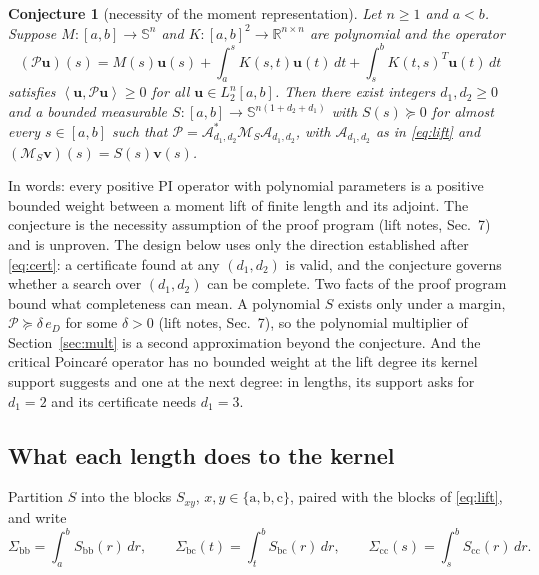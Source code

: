 \documentclass[12pt]{article}
\newcommand{\R}{\mathbb{R}}
\newcommand{\Sym}{\mathbb{S}}
\newcommand{\mcl}[1]{\mathcal{#1}}
\newcommand{\mbf}[1]{\mathbf{#1}}
\newcommand{\ip}[2]{\left\langle #1,#2\right\rangle}
\newcommand{\ba}{\mathrm{a}}
\newcommand{\bb}{\mathrm{b}}
\newcommand{\bc}{\mathrm{c}}
\theoremstyle{plain}
\newtheorem{conjecture}[theorem]{Conjecture}
\theoremstyle{definition}
\theoremstyle{remark}
\begin{document}
\begin{conjecture}[necessity of the moment representation]\label{conj}
Let $n\ge1$ and $a<b$. Suppose $M:[a,b]\to\Sym^n$ and $K:[a,b]^2\to\R^{n\times n}$ are polynomial and the operator
\[
(\mcl P\mbf u)(s)=M(s)\mbf u(s)+\int_a^sK(s,t)\mbf u(t)\,dt+\int_s^bK(t,s)^T\mbf u(t)\,dt
\]
satisfies $\ip{\mbf u}{\mcl P\mbf u}\ge0$ for all $\mbf u\in L_2^n[a,b]$. Then there exist integers $d_1,d_2\ge0$ and a bounded measurable $S:[a,b]\to\Sym^{n(1+d_2+d_1)}$ with $S(s)\succeq0$ for almost every $s\in[a,b]$ such that $\mcl P=\mcl A_{d_1,d_2}^*\mcl M_S\mcl A_{d_1,d_2}$, with $\mcl A_{d_1,d_2}$ as in \eqref{eq:lift} and $(\mcl M_S\mbf v)(s)=S(s)\mbf v(s)$.
\end{conjecture}
In words: every positive PI operator with polynomial parameters is a positive bounded weight between a moment lift of finite length and its adjoint. The conjecture is the necessity assumption of the proof program (lift notes, Sec.~7) and is unproven. The design below uses only the direction established after \eqref{eq:cert}: a certificate found at any $(d_1,d_2)$ is valid, and the conjecture governs whether a search over $(d_1,d_2)$ can be complete. Two facts of the proof program bound what completeness can mean. A polynomial $S$ exists only under a margin, $\mcl P\succeq\delta\,e_D$ for some $\delta>0$ (lift notes, Sec.~7), so the polynomial multiplier of Section~\ref{sec:mult} is a second approximation beyond the conjecture. And the critical Poincar\'e operator has no bounded weight at the lift degree its kernel support suggests and one at the next degree: in lengths, its support asks for $d_1=2$ and its certificate needs $d_1=3$.

\subsection{What each length does to the kernel}

Partition $S$ into the blocks $S_{xy}$, $x,y\in\{\ba,\bb,\bc\}$, paired with the blocks of \eqref{eq:lift}, and write
\[
\Sigma_{\bb\bb}=\int_a^bS_{\bb\bb}(r)\,dr,\qquad \Sigma_{\bb\bc}(t)=\int_t^bS_{\bb\bc}(r)\,dr,\qquad \Sigma_{\bc\bc}(s)=\int_s^bS_{\bc\bc}(r)\,dr .
\]
\end{document}
